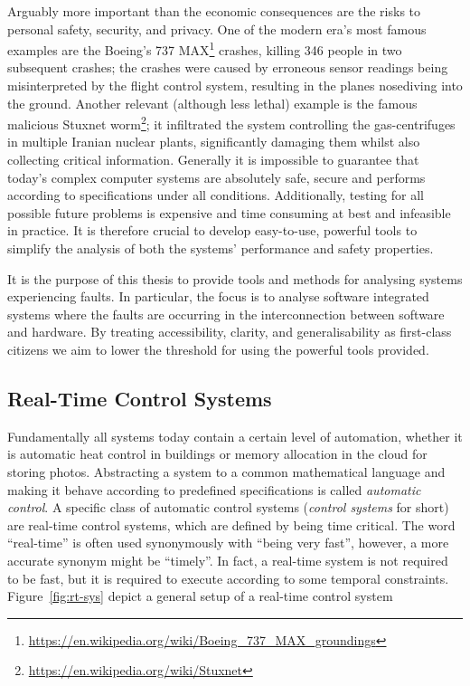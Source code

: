 Arguably more important than the economic consequences are the risks to personal safety, security, and privacy.
One of the modern era's most famous examples are the Boeing's 737 MAX\footnote{\url{https://en.wikipedia.org/wiki/Boeing_737_MAX_groundings}} crashes, killing 346 people in two subsequent crashes; the crashes were caused by erroneous sensor readings being misinterpreted by the flight control system, resulting in the planes nosediving into the ground.
Another relevant (although less lethal) example is the famous malicious Stuxnet worm\footnote{\url{https://en.wikipedia.org/wiki/Stuxnet}}; it infiltrated the system controlling the gas-centrifuges in multiple Iranian nuclear plants, significantly damaging them whilst also collecting critical information. 
Generally it is impossible to guarantee that today's complex computer systems are absolutely safe, secure and performs according to specifications under all conditions.
Additionally, testing for all possible future problems is expensive and time consuming at best and infeasible in practice.
It is therefore crucial to develop easy-to-use, powerful tools to simplify the analysis of both the systems' performance and safety properties.

It is the purpose of this thesis to provide tools and methods for analysing systems experiencing faults.
In particular, the focus is to analyse software integrated systems where the faults are occurring in the interconnection between software and hardware.
By treating accessibility, clarity, and generalisability as first-class citizens we aim to lower the threshold for using the powerful tools provided.




\subsection*{Real-Time Control Systems }%
%
Fundamentally all systems today contain a certain level of automation, whether it is automatic heat control in buildings or memory allocation in the cloud for storing photos.
Abstracting a system to a common mathematical language and making it behave according to predefined specifications is called \emph{automatic control}.
A specific class of automatic control systems (\emph{control systems} for short) are real-time control systems, which are defined by being time critical.
The word ``real-time'' is often used synonymously with ``being very fast'', however, a more accurate synonym might be ``timely''.
In fact, a real-time system is not required to be fast, but it is required to execute according to some temporal constraints.
Figure~\ref{fig:rt-sys} depict a general setup of a real-time control system

